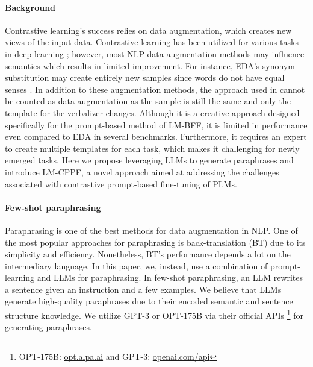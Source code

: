 \documentclass[11pt]{article}
\begin{document}
\paragraph{Background}
Contrastive learning's success relies on data augmentation, which creates new views of the input data. Contrastive learning has been utilized for various tasks in deep learning \cite{le2020contrastive,conde2021clip,abaskohi2022automatic}; however, most NLP data augmentation methods may influence semantics which results in limited improvement. For instance, EDA's synonym substitution may create entirely new samples since words do not have equal senses \cite{keselj2009speech}. In addition to these augmentation methods, the approach used in  cannot be counted as data augmentation as the sample is still the same and only the template for the verbalizer changes. Although it is a creative approach designed specifically for the prompt-based method of LM-BFF, it is limited in performance even compared to EDA in several benchmarks. Furthermore, it requires an expert to create multiple templates for each task, which makes it challenging for newly emerged tasks. Here we propose leveraging LLMs to generate paraphrases and introduce LM-CPPF, a novel approach aimed at addressing the challenges associated with contrastive prompt-based fine-tuning of PLMs.

\paragraph{Few-shot paraphrasing}
Paraphrasing is one of the best methods for data augmentation in NLP. One of the most popular approaches for paraphrasing is back-translation (BT) \cite{sugiyama2019data} due to its simplicity and efficiency. Nonetheless, BT's performance depends a lot on the intermediary language. In this paper, we, instead, use a combination of prompt-learning and LLMs for paraphrasing. In few-shot paraphrasing, an LLM rewrites a sentence given an instruction and a few examples. We believe that LLMs generate high-quality paraphrases due to their encoded semantic and sentence structure knowledge. 
We utilize GPT-3 \cite{https://doi.org/10.48550/arxiv.2005.14165} or OPT-175B \cite{zhang2022opt} via their official APIs \footnote{OPT-175B: \url{opt.alpa.ai} and GPT-3: \url{openai.com/api}} for generating paraphrases. 
\end{document}
